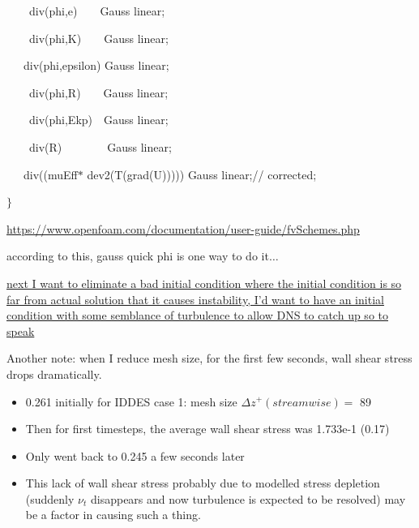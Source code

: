 \documentclass[12pt]{article}
\renewcommand{\_}{\kern-1.5pt\textunderscore\kern-1.5pt}
\begin{document}
\ \ \ \ div(phi,e)\ \ \ \   Gauss linear;\par

\ \ \ \ div(phi,K)\ \ \ \   Gauss linear;\par

\ \ \  div(phi,epsilon) Gauss linear;\par

\ \ \ \ div(phi,R)\ \ \ \   Gauss linear;\par

\ \ \ \ div(phi,Ekp)\ \   Gauss linear;\par

\ \ \ \ div(R)\ \ \ \ \ \ \ \   Gauss linear;\par

\ \ \  div((muEff$\ast$ dev2(T(grad(U))))) Gauss linear;// corrected;\par

$ \} $ \par


\vspace{\baselineskip}
\href{https://www.openfoam.com/documentation/user-guide/fvSchemes.php}{https://www.openfoam.com/documentation/user-guide/fvSchemes.php}\par

according to this, gauss quick phi is one way to do it$ \ldots $ \par

\uline{next I want to eliminate a bad initial condition where the initial condition is so far from actual solution that it causes instability, I’d want to have an initial condition with some semblance of turbulence to allow DNS to catch up so to speak}\par

Another note: when I reduce mesh size, for the first few seconds, wall shear stress drops dramatically.\par

\begin{itemize}
	\item 0.261 initially for IDDES case 1: mesh size  \(  \Delta z^{+} \left( streamwise \right) = \) 89\par

	\item Then for first timesteps, the average wall shear stress was 1.733e-1 (0.17)\par

	\item Only went back to 0.245 a few seconds later\par

	\item This lack of wall shear stress probably due to modelled stress depletion (suddenly  \(  \nu _{t} \)  disappears and now turbulence is expected to be resolved) may be a factor in causing such a thing.\par
\end{itemize}
\end{document}

